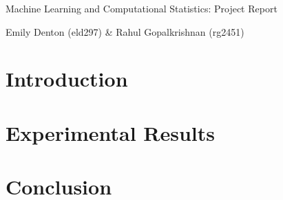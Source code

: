 \documentclass[11pt]{article}
\begin{document}
\vspace*{8cm}

\centerline{\sc \Large Machine Learning and Computational Statistics: Project Report}

\vspace{1cm}

\centerline{\sc \small Emily Denton (eld297)  \& Rahul Gopalkrishnan (rg2451)}
         
\clearpage 


\section{Introduction}

\section{Experimental Results}


\section{Conclusion}
\nocite{*}


\end{document}
